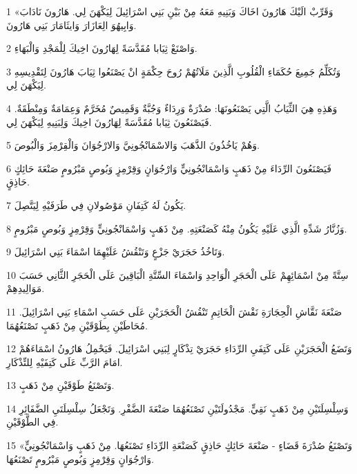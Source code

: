 \par 1 «وَقَرِّبْ الَيْكَ هَارُونَ اخَاكَ وَبَنِيهِ مَعَهُ مِنْ بَيْنِ بَنِي اسْرَائِيلَ لِيَكْهَنَ لِي. هَارُونَ نَادَابَ وَابِيهُوَ الِعَازَارَ وَايثَامَارَ بَنِي هَارُونَ.
\par 2 وَاصْنَعْ ثِيَابا مُقَدَّسَةً لِهَارُونَ اخِيكَ لِلْمَجْدِ وَالْبَهَاءِ.
\par 3 وَتُكَلِّمُ جَمِيعَ حُكَمَاءِ الْقُلُوبِ الَّذِينَ مَلَاتُهُمْ رُوحَ حِكْمَةٍ انْ يَصْنَعُوا ثِيَابَ هَارُونَ لِتَقْدِيسِهِ لِيَكْهَنَ لِي.
\par 4 وَهَذِهِ هِيَ الثِّيَابُ الَّتِي يَصْنَعُونَهَا: صُدْرَةٌ وَرِدَاءٌ وَجُبَّةٌ وَقَمِيصٌ مُخَرَّمٌ وَعِمَامَةٌ وَمِنْطَقَةٌ. فَيَصْنَعُونَ ثِيَابا مُقَدَّسَةً لِهَارُونَ اخِيكَ وَلِبَنِيهِ لِيَكْهَنَ لِي.
\par 5 وَهُمْ يَاخُذُونَ الذَّهَبَ وَالاسْمَانْجُونِيَّ وَالارْجُوَانَ وَالْقِرْمِزَ وَالْبُوصَ.
\par 6 فَيَصْنَعُونَ الرِّدَاءَ مِنْ ذَهَبٍ وَاسْمَانْجُونِيٍّ وَارْجُوَانٍ وَقِرْمِزٍ وَبُوصٍ مَبْرُومٍ صَنْعَةَ حَائِكٍ حَاذِقٍ.
\par 7 يَكُونُ لَهُ كَتِفَانِ مَوْصُولانِ فِي طَرَفَيْهِ لِيَتَّصِلَ.
\par 8 وَزُنَّارُ شَدِّهِ الَّذِي عَلَيْهِ يَكُونُ مِنْهُ كَصَنْعَتِهِ. مِنْ ذَهَبٍ وَاسْمَانْجُونِيٍّ وَقِرْمِزٍ وَبُوصٍ مَبْرُومٍ.
\par 9 وَتَاخُذُ حَجَرَيْ جَزْعٍ وَتَنْقُشُ عَلَيْهِمَا اسْمَاءَ بَنِي اسْرَائِيلَ.
\par 10 سِتَّةً مِنْ اسْمَائِهِمْ عَلَى الْحَجَرِ الْوَاحِدِ وَاسْمَاءَ السِّتَّةِ الْبَاقِينَ عَلَى الْحَجَرِ الثَّانِي حَسَبَ مَوَالِيدِهِمْ.
\par 11 صَنْعَةَ نَقَّاشِ الْحِجَارَةِ نَقْشَ الْخَاتِمِ تَنْقُشُ الْحَجَرَيْنِ عَلَى حَسَبِ اسْمَاءِ بَنِي اسْرَائِيلَ. مُحَاطَيْنِ بِطَوْقَيْنِ مِنْ ذَهَبٍ تَصْنَعُهُمَا.
\par 12 وَتَضَعُ الْحَجَرَيْنِ عَلَى كَتِفَيِ الرِّدَاءِ حَجَرَيْ تِذْكَارٍ لِبَنِي اسْرَائِيلَ. فَيَحْمِلُ هَارُونُ اسْمَاءَهُمْ امَامَ الرَّبِّ عَلَى كَتِفَيْهِ لِلتِّذْكَارِ.
\par 13 وَتَصْنَعُ طَوْقَيْنِ مِنْ ذَهَبٍ.
\par 14 وَسِلْسِلَتَيْنِ مِنْ ذَهَبٍ نَقِيٍّ. مَجْدُولَتَيْنِ تَصْنَعُهُمَا صَنْعَةَ الضَّفْرِ. وَتَجْعَلُ سِلْسِلَتَيِ الضَّفَائِرِ فِي الطَّوْقَيْنِ.
\par 15 «وَتَصْنَعُ صُدْرَةَ قَضَاءٍ - صَنْعَةَ حَائِكٍ حَاذِقٍ كَصَنْعَةِ الرِّدَاءِ تَصْنَعُهَا. مِنْ ذَهَبٍ وَاسْمَانْجُونِيٍّ وَارْجُوَانٍ وَقِرْمِزٍ وَبُوصٍ مَبْرُومٍ تَصْنَعُهَا.
